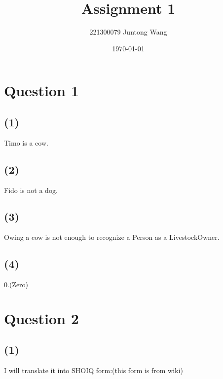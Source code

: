 \documentclass{article}
\title{Assignment 1}
\author{221300079 Juntong Wang}
\date{\today}
\begin{document}
	\maketitle

	\section{Question 1}

	\subsection{(1)}

	Timo is a cow.

	\subsection{(2)}

	Fido is not a dog.

	\subsection{(3)}

	Owing a cow is not enough to recognize a Person as a LivestockOwner.

	\subsection{(4)}

	0.(Zero)

	\section{Question 2}

	\subsection{(1)}
	
	I will translate it into SHOIQ form:(this form is from wiki)
\end{document}
